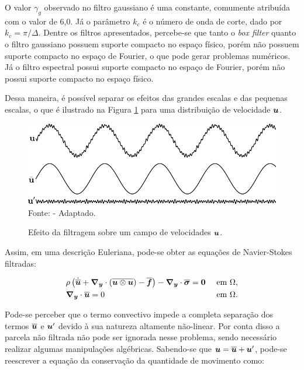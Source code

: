 O valor $\gamma_g$ observado no filtro gaussiano é uma constante, comumente atribuída com o valor de 6,0. Já o parâmetro $k_c$ é o número de onda de corte, dado por $k_c=\pi/\Delta$. Dentre os filtros apresentados, percebe-se que tanto o \textit{box filter} quanto o filtro gaussiano possuem suporte compacto no espaço físico, porém não possuem suporte compacto no espaço de Fourier, o que pode gerar problemas numéricos. Já o filtro espectral possui suporte compacto no espaço de Fourier, porém não possui suporte compacto no espaço físico.

Dessa maneira, é possível separar os efeitos das grandes escalas e das pequenas escalas, o que é ilustrado na Figura \ref{fig:EfeitoFiltragem} para uma distribuição de velocidade $\boldsymbol{u}$.

\begin{figure}[h!]
    \centering
    \caption{Efeito da filtragem sobre um campo de velocidades $\boldsymbol{u}$.}
    \includegraphics[width=.75\linewidth]{Figuras/efeito_filtragem.pdf}
    \\Fonte:  - Adaptado.
    \label{fig:EfeitoFiltragem}
\end{figure}

Assim, em uma descrição Euleriana, pode-se obter as equações de Navier-Stokes filtradas:

\begin{subequations}
    \begin{align}
         & \rho\left({\dot{\overline{\boldsymbol{u}}}+\boldsymbol{\nabla_y}\cdot(\overline{\boldsymbol{u}\otimes\boldsymbol{u}})-\overline{\boldsymbol{f}}}\right)-\boldsymbol{\nabla_y}\cdot\overline{\boldsymbol{\sigma}}=\boldsymbol{0} &  & \text{ em }\Omega\text{,} \\
         & \boldsymbol{\nabla_y}\cdot\overline{\boldsymbol{u}}=0                                                                                      &  & \text{ em }\Omega\text{.}
    \end{align}
\end{subequations}

Pode-se perceber que o termo convectivo impede a completa separação dos termos $\overline{\boldsymbol{u}}$ e $\boldsymbol{u}'$ devido à sua natureza altamente não-linear. Por conta disso a parcela não filtrada não pode ser ignorada nesse problema, sendo necessário realizar algumas manipulações algébricas. Sabendo-se que $\boldsymbol{u}=\overline{\boldsymbol{u}}+\boldsymbol{u}'$, pode-se reescrever a equação da conservação da quantidade de movimento como:


